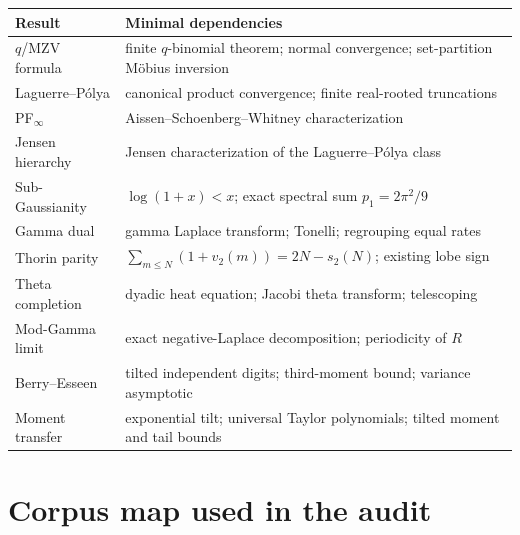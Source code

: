 \documentclass[11pt,oneside]{article}
\theoremstyle{definition}
\theoremstyle{remark}
\begin{document}
\begin{longtable}{@{}p{}p{}@{}}
\toprule
Result & Minimal dependencies\\
\midrule
\endhead
$q$/MZV formula & finite $q$-binomial theorem; normal convergence; set-partition
M\"obius inversion\\
Laguerre--P\'olya & canonical product convergence; finite real-rooted
truncations\\
PF$_\infty$ & Aissen--Schoenberg--Whitney characterization\\
Jensen hierarchy & Jensen characterization of the Laguerre--P\'olya class\\
Sub-Gaussianity & $\log(1+x)<x$; exact spectral sum $p_1=2\pi^2/9$\\
Gamma dual & gamma Laplace transform; Tonelli; regrouping equal rates\\
Thorin parity & $\sum_{m\le N}(1+v_2(m))=2N-s_2(N)$; existing lobe sign\\
Theta completion & dyadic heat equation; Jacobi theta transform; telescoping\\
Mod-Gamma limit & exact negative-Laplace decomposition; periodicity of $R$\\
Berry--Esseen & tilted independent digits; third-moment bound; variance asymptotic\\
Moment transfer & exponential tilt; universal Taylor polynomials; tilted moment
and tail bounds\\
\bottomrule
\end{longtable}

\section{Corpus map used in the audit}
\end{document}
